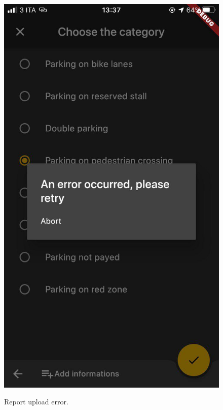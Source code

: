\documentclass[../ATD.tex]{subfiles}
\begin{document}
    \begin{figure}[H]
        \centering
        \includegraphics[scale = 0.17]{assets/report_upload_error.png}\\
        \caption[Report upload error]{Report upload error.}
    \end{figure}
\end{document}

